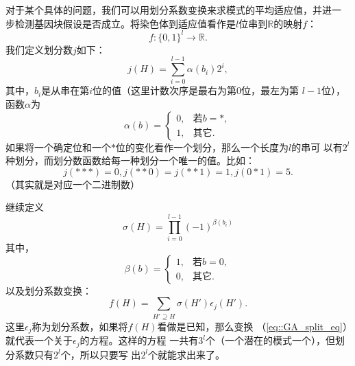 对于某个具体的问题，我们可以用划分系数变换来求模式的平均适应值，并进一
步检测基因块假设是否成立。将染色体到适应值看作是$l$位串到$\mathbb{R}$的映射$f$：
$$
f : \{0, 1\}^l \to \mathbb{R}.
$$
我们定义划分数$j$如下：
\begin{equation}
  j(H) = \sum_{i = 0}^{l - 1}\alpha(b_i)2^i,
  \label{eq::GA_split}
\end{equation}
其中，$b_i$是从串在第$i$位的值（这里计数次序是最右为第$0$位，最左为第
  $l - 1$位），函数$\alpha$为
\begin{equation}
  \alpha(b) = \left\{
  \begin{array}{ll}
    0, &\mbox{若}b = *,\\
    1, &\mbox{其它}.
  \end{array}
  \right.
  \label{eq::GA_bit_mark}
\end{equation}
如果将一个确定位和一个$*$位的变化看作一个划分，那么一个长度为$l$的串可
以有$2^l$种划分，而划分数函数给每一种划分一个唯一的值。比如：
$$
j(***) = 0, j(**0) = j(**1) = 1, j(0*1) = 5.
$$
（其实就是对应一个二进制数）

继续定义
\begin{equation}
  \sigma(H) = \prod_{i = 0}^{l - 1}(-1)^{\beta(b_i)}
  \label{eq::GA_bit_filter}
\end{equation}
其中，
\begin{equation}
  \beta(b) = \left\{
  \begin{array}{ll}
    1, &\mbox{若}b = 0,\\
    0, &\mbox{其它}.
  \end{array}
  \right.
  \label{eq::GA_bit_mark}
\end{equation}
以及划分系数变换：
\begin{equation}
  f(H) = \sum_{H' \supseteq H} \sigma(H')\epsilon_j(H').
  \label{eq::GA_split_eq}
\end{equation}
这里$\epsilon_j$称为划分系数，如果将$f(H)$看做是已知，那么变换
（\ref{eq::GA_split_eq}）就代表一个关于$\epsilon_j$的方程。这样的方程
一共有$3^l$个（一个潜在的模式一个），但划分系数只有$2^l$个，所以只要写
出$2^l$个就能求出来了。

